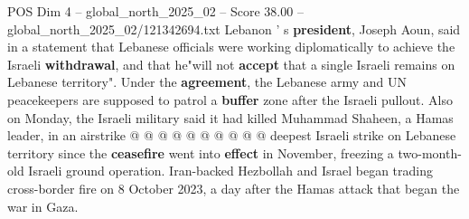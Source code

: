 \begin{textsample}{POS Dim 4 – global\_north\_2025\_02 – Score 38.00 – global\_north\_2025\_02/121342694.txt}
Lebanon ' s \textbf{president}, Joseph Aoun, said in a statement that Lebanese officials were working diplomatically to achieve the Israeli \textbf{withdrawal}, and that he"will not \textbf{accept} that a single Israeli remains on Lebanese territory".
Under the \textbf{agreement}, the Lebanese army and UN peacekeepers are supposed to patrol a \textbf{buffer} zone after the Israeli pullout.
Also on Monday, the Israeli military said it had killed Muhammad Shaheen, a Hamas leader, in an airstrike @ @ @ @ @ @ @ @ @ @ deepest Israeli strike on Lebanese territory since the \textbf{ceasefire} went into \textbf{effect} in November, freezing a two-month-old Israeli ground operation.
Iran-backed Hezbollah and Israel began trading cross-border fire on 8 October 2023, a day after the Hamas attack that began the war in Gaza.

\end{textsample}
